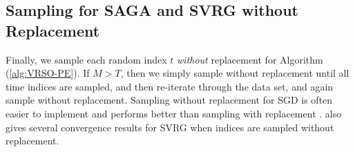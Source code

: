\subsection{Sampling for SAGA and SVRG without Replacement}
\label{subsec:wo_replacement}

Finally, we sample each random index $t$ \textit{without} replacement for Algorithm (\ref{alg:VRSO-PE}). If $M > T$, then we simply sample without replacement until all time indices are sampled, and then re-iterate through the data set, and again sample without replacement. Sampling without replacement for SGD is often easier to implement and performs better than sampling with replacement \citep{Gurbuzbalaban:2015}. \citet{Ohad:2016} also gives several convergence results for SVRG when indices are sampled without replacement.